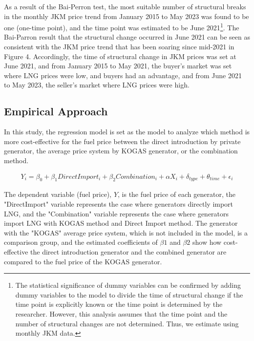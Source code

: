\documentclass[12pt]{article}
\begin{document}
As a result of the Bai-Perron test, the most suitable number of structural breaks in the monthly JKM price trend from January 2015 to May 2023 was found to be one (one-time point), and the time point was estimated to be June 2021\footnote{The statistical significance of dummy variables can be confirmed by adding dummy variables to the model to divide the time of structural change if the time point is explicitly known or the time point is determined by the researcher. However, this analysis assumes that the time point and the number of structural changes are not determined. Thus, we estimate using monthly JKM data.}. The Bai-Parron result that the structural change occurred in June 2021 can be seen as consistent with the JKM price trend that has been soaring since mid-2021 in Figure 4. Accordingly, the time of structural change in JKM prices was set at June 2021, and from January 2015 to May 2021, the buyer's market was set where LNG prices were low, and buyers had an advantage, and from June 2021 to May 2023, the seller's market where LNG prices were high.



\subsection{Empirical Approach}

In this study, the regression model is set as the model to analyze which method is more cost-effective for the fuel price between the direct introduction by private generator, the average price system by KOGAS generator, or the combination method.



\begin{align*}
Y_{i}  = \beta_0 + \beta_1 Direct Import_{i} + \beta_2 Combination_{i} + \alpha X_{i}+ \delta_{type} +  \theta_{time} + \epsilon_{i}
\end{align*}


The dependent variable (fuel price), {$Y$}, is the fuel price of each generator, the "DirectImport" variable represents the case where generators directly import LNG, and the "Combination" variable represents the case where generators import LNG with KOGAS method and Direct Import method. The generator with the "KOGAS" average price system, which is not included in the model, is a comparison group, and the estimated coefficients of {$\beta1$}  and {$\beta2$} show how cost-effective the direct introduction generator and the combined generator are compared to the fuel price of the KOGAS generator.
\end{document}

